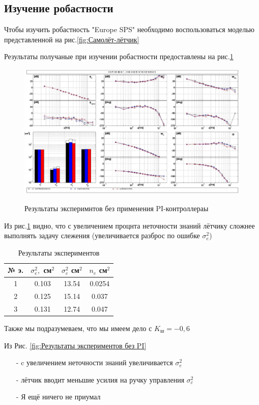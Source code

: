 \subsection{Изучение робастности} 

Чтобы изучить робастность "Europe SPS" необходимо воспользоваться моделью представленной на рис.{\ref{fig:Самолёт-лётчик}}

Результаты получаные при изучении робастности предоставлены на рис.\ref{fig:Модель без PI}

\begin{figure}[H]
    \centering \includegraphics[width=\linewidth]{Оглавление/Part3/figures/Модель без PI.jpg}
    \caption{Результаты эксперимнтов без применения PI-контроллераы}
    {\label{fig:Модель без PI}}
\end{figure}
Из рис.{\ref{fig:Модель без PI}} видно, что с увеличением процнта неточности знаний лётчику сложнее выполнять задачу слежения 
(увеличивается разброс по ошибке $\sigma_e^2$)

\begin{table}[H]
    \caption{Результаты экспериментов}
    \centering
    \label{tab:Результаты экспериментов без PI}
    \begin{tabular}{|c|c|c|c|}
        \hline 
        № э.& $\sigma^2_e,$ см$^2$ & $\sigma^2_c$ см$^2$ & $n_e$ см$^2$ \\ \hline 
        1& 0.103 & 13.54 & 0.0254\\ \hline
        2& 0.125 & 15.14  & 0.037 \\ \hline
        3& 0.131 & 12.74 & 0.047\\ \hline

    \end{tabular}
\end{table}

    Также мы подразумеваем, что мы имеем дело с $K_\text{ш} = -0,6$

    Из Рис. {\ref{fig:Результаты экспериментов без PI}}
    \begin{itemize}
        \item [-] c увеличением неточности знаний увеличивается $\sigma_e^2$
        \item [-] лётчик вводит меньшие усилия на ручку управления $\sigma^2_c$ 
        \item [-]  Я ещё ничего не приумал   
    \end{itemize}